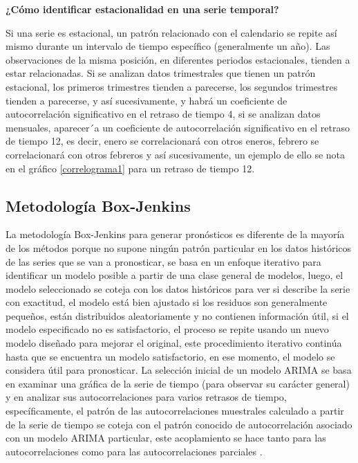 \documentclass[12pt,letterpaper]{report}
\begin{document}
\textbf{¿Cómo identificar estacionalidad en una serie temporal?}

Si una serie es estacional, un patrón relacionado con el calendario se repite
así mismo durante un intervalo de tiempo específico (generalmente un año).
Las observaciones de la misma posición, en diferentes periodos estacionales,
tienden a estar relacionadas. Si se analizan datos trimestrales que tienen un
patrón estacional, los primeros trimestres tienden a parecerse, los segundos
trimestres tienden a parecerse, y así sucesivamente, y habrá un coeficiente de
autocorrelación significativo en el retraso de tiempo 4, si se analizan datos
mensuales, aparecer´a un coeficiente de autocorrelación significativo en el retraso de tiempo 12, es decir, enero se correlacionará con otros eneros, febrero
se correlacionará con otros febreros y así sucesivamente, un ejemplo de ello se nota en el gráfico \ref{correlograma1} para un retraso de tiempo 12.

\subsection{Metodología Box-Jenkins}

La metodología Box-Jenkins para generar pronósticos es diferente de la
mayoría de los métodos porque no supone ningún patrón particular en los
datos históricos de las series que se van a pronosticar, se basa en un enfoque iterativo para identificar un modelo posible a partir de una clase general
de modelos, luego, el modelo seleccionado se coteja con los datos históricos
para ver si describe la serie con exactitud, el modelo está bien ajustado si
los residuos son generalmente pequeños, están distribuidos aleatoriamente y
no contienen información útil, si el modelo especificado no es satisfactorio,
el proceso se repite usando un nuevo modelo diseñado para mejorar el original, este procedimiento iterativo continúa hasta que se encuentra un modelo
satisfactorio, en ese momento, el modelo se considera útil para pronosticar.
La selección inicial de un modelo ARIMA se basa en examinar una gráfica
de la serie de tiempo (para observar su carácter general) y en analizar sus
autocorrelaciones para varios retrasos de tiempo, específicamente, el patrón
de las autocorrelaciones muestrales calculado a partir de la serie de tiempo
se coteja con el patrón conocido de autocorrelación asociado con un modelo
ARIMA particular, este acoplamiento se hace tanto para las autocorrelaciones como para las autocorrelaciones parciales \cite{Isaac}.
\end{document}
